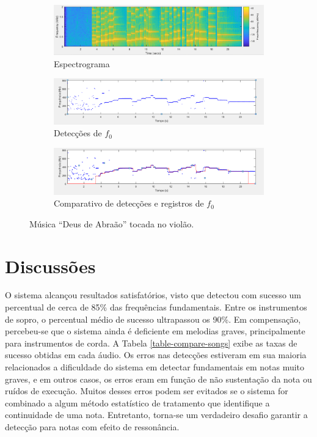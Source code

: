 \begin{figure}
	
	\begin{subfigure}{1\textwidth}
		\includegraphics[width=\linewidth]{pasta1_figuras/violao-002CC-2.png}
		\caption{Espectrograma}
		\label{fig-violao-002CC-2}
	\end{subfigure}
	
	\begin{subfigure}{1\textwidth}
		\includegraphics[width=\linewidth]{pasta1_figuras/violao-002CC-3.png}
		\caption{Detecções de $f_0$}
		\label{fig-violao-002CC-3}
	\end{subfigure}
	
	\begin{subfigure}{1\textwidth}
		\includegraphics[width=\linewidth]{pasta1_figuras/violao-002CC-4.png}
		\caption{Comparativo de detecções e registros de $f_0$}
		\label{fig-violao-002CC-4}
	\end{subfigure}
	\caption{Música ``Deus de Abraão'' tocada no violão.}
\end{figure}



\section{Discussões}

O sistema alcançou resultados satisfatórios, visto que detectou com sucesso um percentual de cerca de 85\% das frequências fundamentais. Entre os instrumentos de sopro, o percentual médio de sucesso ultrapassou os 90\%. Em compensação, percebeu-se que o sistema ainda é deficiente em melodias graves, principalmente para instrumentos de corda. A Tabela \ref{table-compare-songs} exibe as taxas de sucesso obtidas em cada áudio. Os erros nas detecções estiveram em sua maioria relacionados a dificuldade do sistema em detectar fundamentais em notas muito graves, e em outros casos, os erros eram em função de não sustentação da nota ou ruídos de execução. Muitos desses erros podem ser evitados se o sistema for combinado a algum método estatístico de tratamento que identifique a continuidade de uma nota. Entretanto, torna-se um verdadeiro desafio garantir a detecção para notas com efeito de ressonância.

